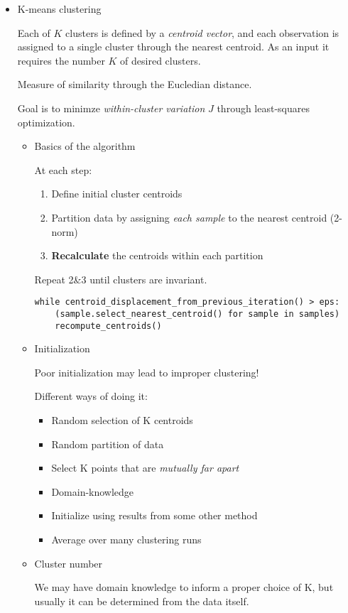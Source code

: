 \documentclass[11pt]{article}
\begin{document}
\begin{itemize}
\begin{itemize}
\item K-means clustering
\label{sec-2-2-1-3}

Each of $K$ clusters is defined by a \emph{centroid vector}, and each observation is assigned to a single cluster through the nearest centroid. As an input it requires the number $K$ of desired clusters.

Measure of similarity through the Eucledian distance.

Goal is to minimze \emph{within-cluster variation} $J$ through least-squares optimization.

\begin{itemize}
\item Basics of the algorithm
\label{sec-2-2-1-3-1}

At each step:
\begin{enumerate}
\item Define initial cluster centroids
\item Partition data by assigning \emph{each sample} to the nearest centroid (2-norm)
\item \textbf{Recalculate} the centroids within each partition
\end{enumerate}
Repeat 2\&3 until clusters are invariant.
\begin{verbatim}
while centroid_displacement_from_previous_iteration() > eps:
    (sample.select_nearest_centroid() for sample in samples)
    recompute_centroids()
\end{verbatim}

\item Initialization
\label{sec-2-2-1-3-2}

Poor initialization may lead to improper clustering!

Different ways of doing it:
\begin{itemize}
\item Random selection of K centroids
\item Random partition of data
\item Select K points that are \emph{mutually far apart}
\item Domain-knowledge
\item Initialize using results from some other method
\item Average over many clustering runs
\end{itemize}


\item Cluster number
\label{sec-2-2-1-3-3}

We may have domain knowledge to inform a proper choice of K, but usually it can be determined from the data itself.


\end{itemize}
\end{itemize}
\end{itemize}
\end{document}
